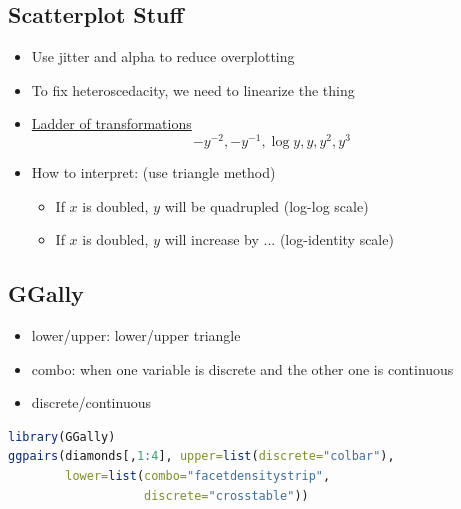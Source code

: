 \documentclass{article}
\begin{document}
\begin{multicols}{2}
\subsection{Scatterplot Stuff}
\begin{itemize}
	\item Use jitter and alpha to reduce overplotting
	\item To fix heteroscedacity, we need to linearize the thing
	\item \underline{Ladder of transformations}
	$$-y^{-2}, -y^{-1}, \log{y}, y, y^2, y^3$$
	\item How to interpret: (use triangle method)
	\begin{itemize}
		\item If $x$ is doubled, $y$ will be quadrupled (log-log scale)
		\item If $x$ is doubled, $y$ will increase by ... (log-identity scale)
	\end{itemize}
\end{itemize}
\subsection{GGally}
\begin{itemize}
	\item lower/upper: lower/upper triangle
	\item combo: when one variable is discrete and the other one is continuous
	\item discrete/continuous
\end{itemize}
\begin{lstlisting}[language=R]
library(GGally)
ggpairs(diamonds[,1:4], upper=list(discrete="colbar"),
        lower=list(combo="facetdensitystrip",
                   discrete="crosstable"))
\end{lstlisting}

\end{multicols}
\end{document}
